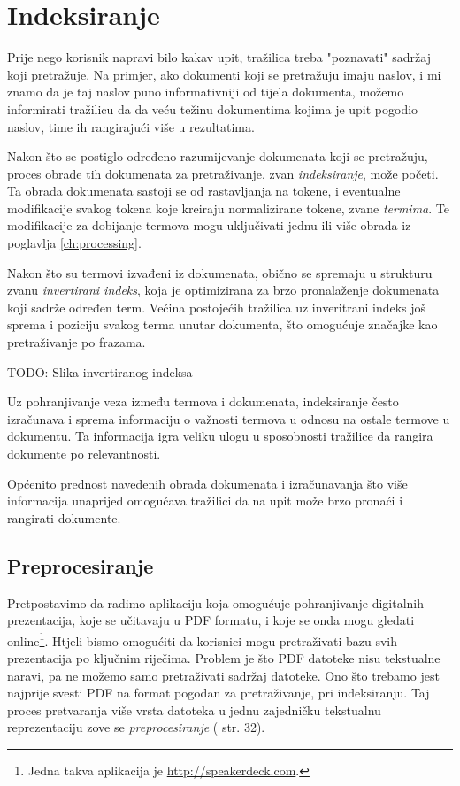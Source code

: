 \documentclass[11pt]{scrreprt}
\begin{document}
\section{Indeksiranje}

Prije nego korisnik napravi bilo kakav upit, tražilica treba "poznavati" sadržaj koji pretražuje. Na primjer, ako dokumenti koji se pretražuju imaju naslov, i mi znamo da je taj naslov puno informativniji od tijela dokumenta, možemo informirati tražilicu da da veću težinu dokumentima kojima je upit pogodio naslov, time ih rangirajući više u rezultatima.

Nakon što se postiglo određeno razumijevanje dokumenata koji se pretražuju, proces obrade tih dokumenata za pretraživanje, zvan \textit{indeksiranje}, može početi. Ta obrada dokumenata sastoji se od rastavljanja na tokene, i eventualne modifikacije svakog tokena koje kreiraju normalizirane tokene, zvane \textit{termima}. Te modifikacije za dobijanje termova mogu uključivati jednu ili više obrada iz poglavlja \ref{ch:processing}.

Nakon što su termovi izvađeni iz dokumenata, obično se spremaju u strukturu zvanu \textit{invertirani indeks}, koja je optimizirana za brzo pronalaženje dokumenata koji sadrže određen term. Većina postojećih tražilica uz inveritrani indeks još sprema i poziciju svakog terma unutar dokumenta, što omogućuje značajke kao pretraživanje po frazama.

TODO: Slika invertiranog indeksa

Uz pohranjivanje veza između termova i dokumenata, indeksiranje često izračunava i sprema informaciju o važnosti termova u odnosu na ostale termove u dokumentu. Ta informacija igra veliku ulogu u sposobnosti tražilice da rangira dokumente po relevantnosti.

Općenito prednost navedenih obrada dokumenata i izračunavanja što više informacija unaprijed omogućava tražilici da na upit može brzo pronaći i rangirati dokumente.

\subsection{Preprocesiranje}

Pretpostavimo da radimo aplikaciju koja omogućuje pohranjivanje digitalnih prezentacija, koje se učitavaju u PDF formatu, i koje se onda mogu gledati online\footnote{Jedna takva aplikacija je \url{http://speakerdeck.com}.}. Htjeli bismo omogućiti da korisnici mogu pretraživati bazu svih prezentacija po ključnim riječima. Problem je što PDF datoteke nisu tekstualne naravi, pa ne možemo samo pretraživati sadržaj datoteke. Ono što trebamo jest najprije svesti PDF na format pogodan za pretraživanje, pri indeksiranju. Taj proces pretvaranja više vrsta datoteka u jednu zajedničku tekstualnu reprezentaciju zove se \textit{preprocesiranje} (\cite{taming} str. 32).
\end{document}
